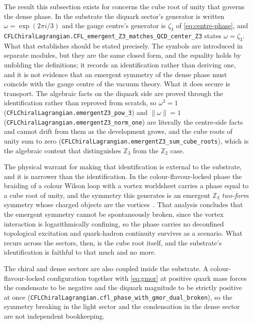 \documentclass[aps,prd,nofootinbib,superscriptaddress,12pt]{revtex4-2}
\DeclareRobustCommand{\lb}{\discretionary{}{}{}}
\begin{document}
The result this subsection exists for concerns the cube root of unity that
governs the dense phase. In the substrate the diquark sector's generator is
written $\omega = \exp(2\pi i/3)$ and the gauge centre's generator is
$\zeta_3$ of \eqref{eq:centre-phase}, and
\texttt{CFLChiral\lb{}Lagrangian.\lb{}CFL\_\lb{}emergent\_\lb{}Z3\_\lb{}matches\_\lb{}QCD\_\lb{}center\_\lb{}Z3} states
$\omega = \zeta_3$. What that establishes should be stated precisely. The
symbols are introduced in separate modules, but they are the same closed form,
and the equality holds by unfolding the definitions; it records an
identification rather than deriving one, and it is not evidence that an emergent
symmetry of the dense phase must coincide with the gauge centre of the vacuum
theory. What it does secure is transport. The algebraic facts on the diquark
side are proved through the identification rather than reproved from scratch, so
$\omega^3 = 1$ (\texttt{CFLChiral\lb{}Lagrangian.\lb{}emergent\lb{}Z3\_\lb{}pow\_\lb{}3}) and
$\lVert \omega \rVert = 1$
(\texttt{CFLChiral\lb{}Lagrangian.\lb{}emergent\lb{}Z3\_\lb{}norm\_\lb{}one}) are literally the
centre-side facts and cannot drift from them as the development grows, and the
cube roots of unity sum to zero
(\texttt{CFLChiral\lb{}Lagrangian.\lb{}emergent\lb{}Z3\_\lb{}sum\_\lb{}cube\_\lb{}roots}), which is the
algebraic content that distinguishes $\mathbb{Z}_3$ from the $\mathbb{Z}_2$ case.

The physical warrant for making that identification is external to the
substrate, and it is narrower than the identification. In the
colour-flavour-locked phase the braiding of a colour Wilson loop with a vortex
worldsheet carries a phase equal to a cube root of unity, and the symmetry this
generates is an emergent $\mathbb{Z}_3$ \emph{two-form} symmetry whose charged
objects are the vortices~\cite[Eqs.~(24)--(25)]{HironoTanizaki2018}. That
analysis concludes that the emergent symmetry cannot be spontaneously broken,
since the vortex interaction is logarithmically confining, so the phase carries
no deconfined topological excitation and quark-hadron continuity survives as a
scenario. What recurs across the sectors, then, is the cube root itself, and the
substrate's identification is faithful to that much and no more.

The chiral and dense sectors are also coupled inside the substrate. A
colour-flavour-locked configuration together with \eqref{eq:gmor} at positive
quark mass forces the condensate to be negative and the diquark magnitude to be
strictly positive at once
(\texttt{CFLChiral\lb{}Lagrangian.\lb{}cfl\_\lb{}phase\_\lb{}with\_\lb{}gmor\_\lb{}dual\_\lb{}broken}), so the
symmetry breaking in the light sector and the condensation in the dense sector
are not independent bookkeeping.
\end{document}
